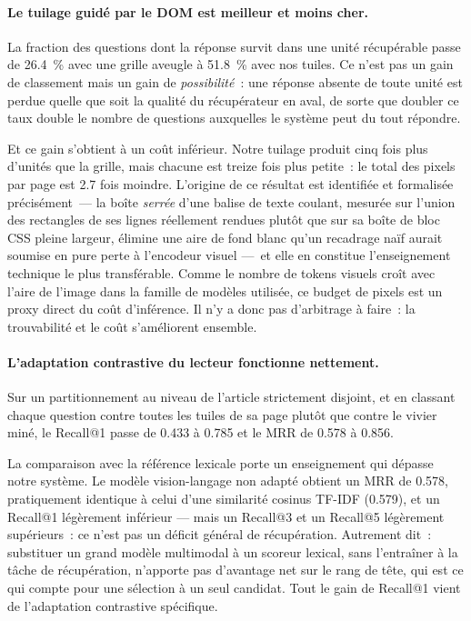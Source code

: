 \paragraph{Le tuilage guidé par le DOM est meilleur et moins cher.} La fraction
des questions dont la réponse survit dans une unité récupérable passe de
\SI{26.4}{\percent} avec une grille aveugle à \SI{51.8}{\percent} avec nos
tuiles. Ce n'est pas un gain de classement mais un gain de \emph{possibilité}~:
une réponse absente de toute unité est perdue quelle que soit la qualité du
récupérateur en aval, de sorte que doubler ce taux double le nombre de questions
auxquelles le système peut du tout répondre.

Et ce gain s'obtient à un coût inférieur. Notre tuilage produit cinq fois plus
d'unités que la grille, mais chacune est treize fois plus petite~: le total des
pixels par page est \num{2.7} fois moindre. L'origine de ce résultat est
identifiée et formalisée précisément~--- la boîte \emph{serrée} d'une balise de
texte coulant, mesurée sur l'union des rectangles de ses lignes réellement
rendues plutôt que sur sa boîte de bloc CSS pleine largeur, élimine une aire de
fond blanc qu'un recadrage naïf aurait soumise en pure perte à l'encodeur
visuel ---~et elle en constitue l'enseignement technique le plus transférable.
Comme le nombre de tokens visuels croît avec l'aire de l'image dans la famille
de modèles utilisée, ce budget de pixels est un proxy direct du coût
d'inférence. Il n'y a donc pas d'arbitrage à faire~: la trouvabilité et le coût
s'améliorent ensemble.

\paragraph{L'adaptation contrastive du lecteur fonctionne nettement.} Sur un
partitionnement au niveau de l'article strictement disjoint, et en classant
chaque question contre toutes les tuiles de sa page plutôt que contre le vivier
miné, le Recall@1 passe de \num{0.433} à \num{0.785} et le MRR de \num{0.578} à
\num{0.856}.

La comparaison avec la référence lexicale porte un enseignement qui dépasse notre
système. Le modèle vision-langage non adapté obtient un MRR de \num{0.578},
pratiquement identique à celui d'une similarité cosinus TF-IDF (\num{0.579}), et
un Recall@1 légèrement inférieur --- mais un Recall@3 et un Recall@5 légèrement
supérieurs~: ce n'est pas un déficit général de récupération. Autrement dit~:
substituer un grand modèle multimodal à un scoreur lexical, sans l'entraîner à
la tâche de récupération, n'apporte pas d'avantage net sur le rang de tête, qui
est ce qui compte pour une sélection à un seul candidat. Tout le gain de
Recall@1 vient de l'adaptation contrastive spécifique.


